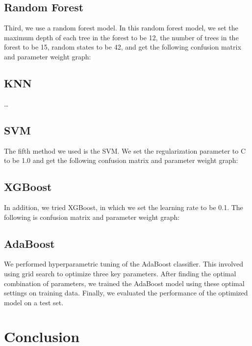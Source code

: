 \documentclass[12pt]{article}
\begin{document}
\subsection{Random Forest}
Third, we use a random forest model. In this random forest model, we set the maximum depth of each tree in the forest to be 12, the number of trees in the forest to be 15, random states to be 42, and get the following confusion matrix and parameter weight graph:

\subsection{KNN}
\ldots

\subsection{SVM}
The fifth method we used is the SVM. We set the regularization parameter to C to be 1.0 and get the following confusion matrix and parameter weight graph:

\subsection{XGBoost}
In addition, we tried XGBoost, in which we set the learning rate to be 0.1. The following is confusion matrix and parameter weight graph:

\subsection{AdaBoost}
We performed hyperparametric tuning of the AdaBoost classifier. This involved using grid search to optimize three key parameters. After finding the optimal combination of parameters, we trained the AdaBoost model using these optimal settings on training data. Finally, we evaluated the performance of the optimized model on a test set.

\section{Conclusion}
\end{document}
